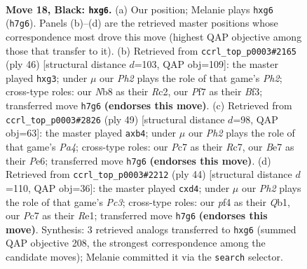 \documentclass[11pt]{article}
\begin{document}
\clearpage

\begin{figure}[p]\centering
\begin{subfigure}{0.46\textwidth}\centering
\resizebox{\linewidth}{!}{%
\newchessgame
\chessboard[
  setfen={rnr3k1/ppp1bp1p/q5P1/P2pNb2/3P1P2/1P2P1P1/8/RNBQ1RK1 b - - 0 18},
  showmover=false,
  pgfstyle=straightmove, color=movearrow, markmove={h7-g6}
]}
\caption{}
\end{subfigure}\hfill
\begin{subfigure}{0.46\textwidth}\centering
\resizebox{\linewidth}{!}{%
\newchessgame
\chessboard[
  setfen={1r2brk1/2q3p1/2ppp2p/p2n4/P2P4/Q4Bp1/1PRBPP1P/4R1K1 w - - 0 24},
  showmover=false,
  pgfstyle=straightmove, color=movearrow, markmove={h2-g3}
]}
\caption{}
\end{subfigure}
\\[4pt]
\begin{subfigure}{0.46\textwidth}\centering
\resizebox{\linewidth}{!}{%
\newchessgame
\chessboard[
  setfen={4k2r/2rp1p2/3bpp1p/pB6/1P1PP2N/Pq3PP1/2bQ1R1P/R5K1 b k - 1 25},
  showmover=false,
  pgfstyle=straightmove, color=movearrow, markmove={a5-b4}
]}
\caption{}
\end{subfigure}\hfill
\begin{subfigure}{0.46\textwidth}\centering
\resizebox{\linewidth}{!}{%
\newchessgame
\chessboard[
  setfen={3r2k1/pbr1qpp1/1p2p1np/n7/P2pP3/2P1BN1P/5PP1/RQ2RBK1 w - - 0 23},
  showmover=false,
  pgfstyle=straightmove, color=movearrow, markmove={c3-d4}
]}
\caption{}
\end{subfigure}
\caption{\textbf{Move 18, Black: \texttt{hxg6}.} (a) Our position; Melanie plays \texttt{hxg6} (\texttt{h7g6}). Panels (b)--(d) are the retrieved master positions whose correspondence most drove this move (highest QAP objective among those that transfer to it). (b) Retrieved from \texttt{ccrl\_top\_p0003\#2165} (ply 46) [structural distance $d$=103, QAP obj=109]: the master played \texttt{hxg3}; under $\mu$ our \emph{Ph2} plays the role of that game's \emph{Ph2}; cross-type roles: our \emph{N}b8 as their \emph{R}c2, our \emph{P}f7 as their \emph{B}f3; transferred move \texttt{h7g6} \textbf{(endorses this move)}. (c) Retrieved from \texttt{ccrl\_top\_p0003\#2826} (ply 49) [structural distance $d$=98, QAP obj=63]: the master played \texttt{axb4}; under $\mu$ our \emph{Ph2} plays the role of that game's \emph{Pa4}; cross-type roles: our \emph{P}c7 as their \emph{R}c7, our \emph{B}e7 as their \emph{P}e6; transferred move \texttt{h7g6} \textbf{(endorses this move)}. (d) Retrieved from \texttt{ccrl\_top\_p0003\#2212} (ply 44) [structural distance $d$=110, QAP obj=36]: the master played \texttt{cxd4}; under $\mu$ our \emph{Ph2} plays the role of that game's \emph{Pc3}; cross-type roles: our \emph{p}f4 as their \emph{Q}b1, our \emph{P}c7 as their \emph{R}e1; transferred move \texttt{h7g6} \textbf{(endorses this move)}. Synthesis: 3 retrieved analogs transferred to \texttt{hxg6} (summed QAP objective 208, the strongest correspondence among the candidate moves); Melanie committed it via the \texttt{search} selector.}
\label{fig:thought-m35}
\end{figure}
\end{document}
